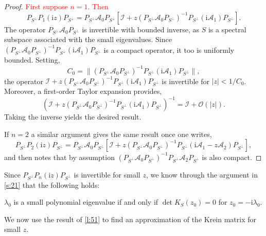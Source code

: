 \documentclass[review,onefignum,onetabnum]{siamart171218}
\def\det{\mathop\mathrm{det}\nolimits}
\newcommand{\rmi}{\mathrm{i}}
\newcommand{\calA}{\mathcal{A}}
\newcommand{\calI}{\mathcal{I}}
\newcommand{\calO}{\mathcal{O}}
\newcommand{\vK}{\bm{\mathit{K}}}
\newcommand{\vx}{\bm{\mathit{x}}}
\newcommand{\vn}{\bm{\mathit{0}}}
\newcommand{\revised}[1]{ \textcolor{red}{#1} }
\begin{document}
\begin{proof}
\revised{
First suppose $n=1$. Then
}
\[
P_{S^\perp}P_1(\rmi z)P_{S^\perp}=P_{S^\perp}\calA_0P_{S^\perp}
\left[\calI+z
\left(P_{S^\perp}\calA_0P_{S^\perp}\right)^{-1}P_{S^\perp}(\rmi\calA_1)P_{S^\perp}\right].
\]
The operator $P_{S^\perp}\calA_0P_{S^\perp}$ is invertible with bounded inverse, as $S$ is a spectral subspace associated with the small eigenvalues. Since $\left(P_{S^\perp}\calA_0P_{S^\perp}\right)^{-1}P_{S^\perp}(\rmi\calA_1)P_{S^\perp}$ is a compact operator, it too is uniformly bounded. Setting,
\[
C_0=\|\left(P_{S^\perp}\calA_0P_{S^\perp}\right)^{-1}P_{S^\perp}(\rmi\calA_1)P_{S^\perp}\|,
\]
the operator $\calI+z
\left(P_{S^\perp}\calA_0P_{S^\perp}\right)^{-1}P_{S^\perp}(\rmi\calA_1)P_{S^\perp}$ is invertible for $|z|<1/C_0$. Moreover, a first-order Taylor expansion provides,
\[
\left(\calI+z
\left(P_{S^\perp}\calA_0P_{S^\perp}\right)^{-1}P_{S^\perp}(\rmi\calA_1)P_{S^\perp}\right)^{-1}=\calI+\calO(|z|).
\]
Taking the inverse yields the desired result.

If $n=2$ a similar argument gives the same result once one writes,
\[
P_{S^\perp}P_2(\rmi z)P_{S^\perp}=P_{S^\perp}\calA_0P_{S^\perp}
\left[\calI+z
\left(P_{S^\perp}\calA_0P_{S^\perp}\right)^{-1}P_{S^\perp}\left(\rmi\calA_1-z\calA_2\right)P_{S^\perp}\right],
\]
and then notes that by assumption $\left(P_{S^\perp}\calA_0P_{S^\perp}\right)^{-1}P_{S^\perp}\calA_2P_{S^\perp}$ is also compact.
\end{proof}

Since $P_{S^\perp}P_n(\rmi z)P_{S^\perp}$ is invertible for small $z$, we know through the argument in \cref{s:21} that the following holds:

\begin{corollary}\label{cor:51}
$\lambda_0$ is a small polynomial eigenvalue if and only if $\det\vK_S(z_0)=0$ for $z_0=-\rmi\lambda_0$.
\end{corollary}


We now use the result of \cref{l:51} to find an approximation of the Krein matrix for small $z$.
\end{document}
